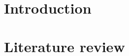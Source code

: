 \documentclass[12pt, a4paper]{article}
\begin{document}

\section{Introduction}



\section{Literature review}





\end{document}
